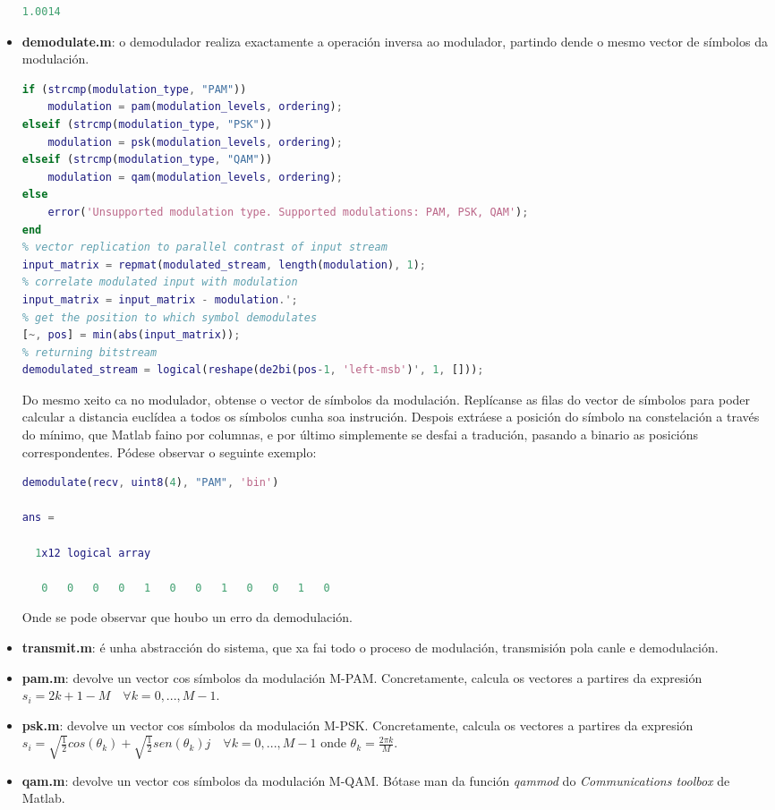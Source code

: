 \documentclass[
	10pt, %
	spanish, %
]{fphw}
\begin{document}
\begin{itemize}
\begin{lstlisting}[language=matlab]
    1.0014
\end{lstlisting}
\item \textbf{demodulate.m}: o demodulador realiza exactamente a operación inversa ao modulador, partindo dende o mesmo vector de símbolos da modulación.
\begin{lstlisting}[language=matlab]
% modulation type checking and modulation computation
if (strcmp(modulation_type, "PAM"))
	modulation = pam(modulation_levels, ordering);
elseif (strcmp(modulation_type, "PSK"))
	modulation = psk(modulation_levels, ordering);
elseif (strcmp(modulation_type, "QAM"))
	modulation = qam(modulation_levels, ordering);
else
	error('Unsupported modulation type. Supported modulations: PAM, PSK, QAM');
end
% vector replication to parallel contrast of input stream
input_matrix = repmat(modulated_stream, length(modulation), 1);
% correlate modulated input with modulation
input_matrix = input_matrix - modulation.';
% get the position to which symbol demodulates
[~, pos] = min(abs(input_matrix));
% returning bitstream
demodulated_stream = logical(reshape(de2bi(pos-1, 'left-msb')', 1, []));
\end{lstlisting}
Do mesmo xeito ca no modulador, obtense o vector de símbolos da modulación. Replícanse as filas do vector de símbolos para poder calcular a distancia euclídea a todos os símbolos cunha soa instrución. Despois extráese a posición do símbolo na constelación a través do mínimo, que Matlab faino por columnas, e por último simplemente se desfai a tradución, pasando a binario as posicións correspondentes. Pódese observar o seguinte exemplo:
\begin{lstlisting}[language=matlab]
demodulate(recv, uint8(4), "PAM", 'bin')

ans =

  1x12 logical array

   0   0   0   0   1   0   0   1   0   0   1   0
\end{lstlisting}
Onde se pode observar que houbo un erro da demodulación.
\item \textbf{transmit.m}: é unha abstracción do sistema, que xa fai todo o proceso de modulación, transmisión pola canle e demodulación.
\item \textbf{pam.m}: devolve un vector cos símbolos da modulación M-PAM. Concretamente, calcula os vectores a partires da expresión $s_i = 2k + 1 - M \quad \forall k = 0, ..., M-1$.
\item \textbf{psk.m}: devolve un vector cos símbolos da modulación M-PSK. Concretamente, calcula os vectores a partires da expresión $s_i = \sqrt{\frac{1}{2}} cos(\theta_k) + \sqrt{\frac{1}{2}} sen(\theta_k)j \quad \forall k = 0,...,M-1$ onde $\theta_k = \frac{2\pi k}{M}$.
\item \textbf{qam.m}: devolve un vector cos símbolos da modulación M-QAM. Bótase man da función \textit{qammod} do \textit{Communications toolbox} de Matlab. 
\end{itemize}
\end{document}
